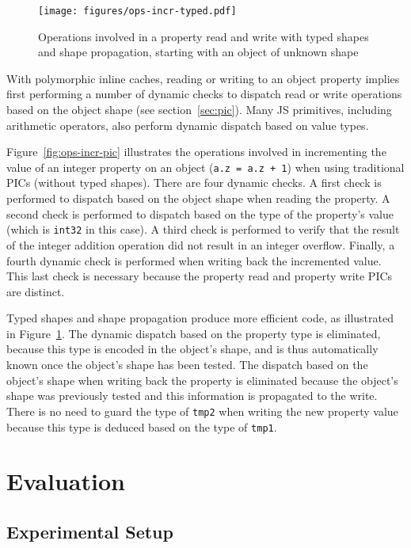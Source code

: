 \documentclass[preprint]{sigplanconf}
\begin{document}
\begin{figure}[tb]
\begin{center}
\texttt{[image: figures/ops-incr-typed.pdf]}
\end{center}
\caption{Operations involved in a property read and write with typed shapes and shape propagation, starting with an object of unknown shape\label{fig:ops-incr-typed}}
\end{figure}

With polymorphic inline caches, reading or writing to an object property
implies first performing a number of dynamic checks to dispatch read or
write operations based on the object shape (see section~\ref{sec:pic}). Many
JS primitives, including arithmetic operators, also perform dynamic dispatch
based on value types.

Figure~\ref{fig:ops-incr-pic} illustrates the operations involved in
incrementing the value of an integer property on an object
({\tt a.z = a.z + 1}) when using traditional PICs (without typed shapes).
There are four dynamic checks. A first check is performed to dispatch based
on the object shape when reading the property. A second check is performed to
dispatch based on the type of the property's value (which is {\tt int32}
in this case). A third check is performed to verify that the result of the
integer addition operation did not result in an integer overflow. Finally, a
fourth dynamic check is performed when writing back the incremented value.
This last check is necessary because the property read and property write
PICs are distinct.

Typed shapes and shape propagation produce more efficient code, as
illustrated in Figure~\ref{fig:ops-incr-typed}. The dynamic
dispatch based on the property type is eliminated, because this type is
encoded in the object's shape, and is thus automatically known once the
object's shape has been tested. The dispatch based on the object's
shape when writing back the property is eliminated because the object's shape
was previously tested and this information is propagated to the write.
There is no need to guard the type of {\tt tmp2} when writing the new
property value because this type is deduced based on the type of {\tt tmp1}.

 
\section{Evaluation}\label{sec:evaluation}
\subsection{Experimental Setup}
\end{document}
